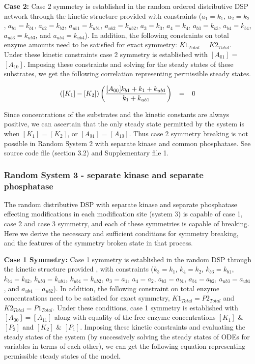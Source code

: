 \documentclass[9pt,lineno]{elife}
\begin{document}
\begin{appendixbox}
\textbf{Case 2:} Case 2 symmetry is established in the random ordered distributive DSP network through the kinetic structure provided  with constraints ($a_1 = k_1$, $a_2 = k_2$, $a_{b1} = k_{b1}$, $a_{b2} = k_{b2}$, $a_{ub1} = k_{ub1}$, $a_{ub2} = k_{ub2}$, $a_3 = k_3$, $a_4 = k_4$, $a_{b3} = k_{b3}$, $a_{b4} = k_{b4}$, $a_{ub3} = k_{ub3}$, and $a_{ub4} = k_{ub4}$). In addition, the following constraints on total enzyme amounts need to be satisfied for exact symmetry:  $K1_{Total} = K2_{Total}$. Under these kinetic constraints case 2 symmetry is established with $[A_{01}]$ =  $[A_{10}]$. Imposing these constraints and solving for the steady states of these substrates, we get the following correlation representing permissible steady states.

\begin{equation}
    \scriptsize{([K_1]-[K_2])\left(\frac{[A_{00}]k_{b1}+k_1+k_{ub1}}{k_1+k_{ub1}}\right) \quad = \quad 0}
\end{equation}

Since concentrations of the substrates and the kinetic constants are always positive, we can ascertain that the only steady state permitted by the system is when $[K_1]$ = $[K_2]$, or $[A_{01}]$ = $[A_{10}]$. Thus case 2 symmetry breaking is not possible in Random System 2 with separate kinase and common phosphatase. See source code file (section 3.2) and Supplementary file 1. 

\subsubsection*{Random System 3 - separate kinase and separate phosphatase}

The random distributive DSP with separate kinase and separate phosphatase effecting modifications in each modification site (system 3) is capable of case 1, case 2 and case 3 symmetry, and each of these symmetries is capable of breaking. Here we derive the necessary and sufficient conditions for symmetry breaking, and the features of the symmetry broken state in that process. 

\textbf{Case 1 Symmetry:} Case 1 symmetry is established in the random DSP through the kinetic structure provided , with constraints ($k_3 = k_1$, $k_4 = k_2$, $k_{b3} = k_{b1}$, $k_{b4} = k_{b2}$, $k_{ub3} = k_{ub1}$, $k_{ub4} = k_{ub2}$, $a_3 = a_1$, $a_4 = a_2$, $a_{b3} = a_{b1}$, $a_{b4} = a_{b2}$, $a_{ub3} = a_{ub1}$, and $a_{ub4} = a_{ub2}$). In addition, the following constraint on total enzyme concentrations need to be satisfied for exact symmetry, $K1_{Total} = P2_{Total}$ and $K2_{Total} = P1_{Total}$. Under these conditions, case 1 symmetry is established with $[A_{00}] = [A_{11}]$ along with equality  of the free enzyme concentrations $[K_1]$ \& $[P_2]$ and $[K_2]$ \& $[P_1]$. Imposing these kinetic constraints and evaluating the steady states of the system (by successively solving  the steady states of ODEs for variables in terms of each other), we can get the following equation representing permissible steady states of the model. 


\end{appendixbox}
\end{document}
